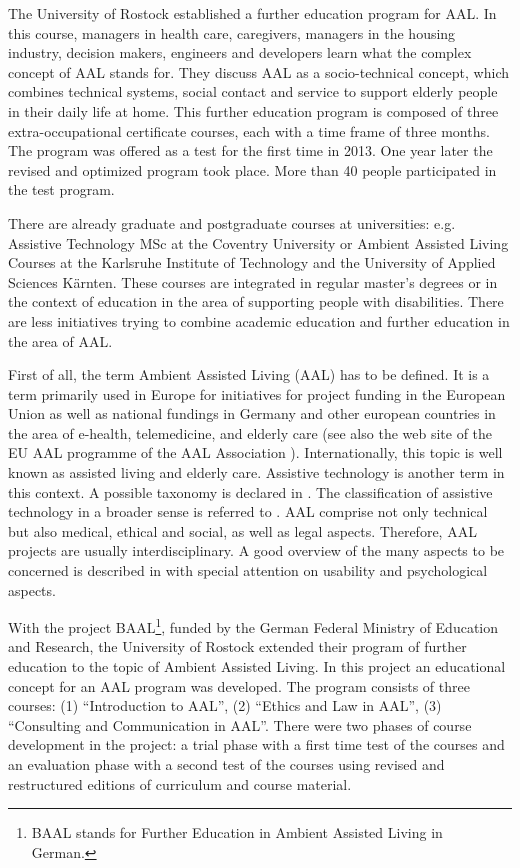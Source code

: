\documentclass[runningheads,a4paper]{llncs}
\begin{document}
The University of Rostock established a further education program for AAL. In this course, managers in health care, caregivers, managers in the housing industry, decision makers, engineers and developers learn what the complex concept of AAL stands for. They discuss AAL as a socio-technical concept, which combines technical systems, social contact and service to support elderly people in their daily life at home. This further education program is composed of three extra-occupational certificate courses, each with a time frame of three months. The program was offered as a test for the first time in 2013. One year later the revised and optimized program took place. More than 40 people participated in the test program.

There are already graduate and postgraduate courses at universities: e.g. Assistive Technology MSc at the Coventry University or Ambient Assisted Living Courses at the Karlsruhe Institute of Technology and the University of Applied Sciences Kärnten. These courses are integrated in regular master's degrees or in the context of education in the area of supporting people with disabilities. There are less initiatives trying to combine academic education and further education in the area of AAL.

First of all, the term Ambient Assisted Living (AAL) has to be defined. It is a term primarily used in Europe for initiatives for project funding in the European Union as well as national fundings in Germany and other european countries in the area of e-health, telemedicine, and elderly care (see also the web site of the EU AAL programme of the AAL Association \cite{EUAAL}).  Internationally, this topic is well known as assisted living and elderly care. Assistive technology is another term in this context. A possible taxonomy is declared in \cite{DMBB+07}. The classification of assistive technology in a broader sense is referred to \cite{DMBB+07}. 
AAL comprise not only technical but also medical, ethical and social, as well as legal aspects. Therefore, AAL projects are usually interdisciplinary. A good overview of the many aspects to be concerned is described in \cite{LeFe10} with special attention on usability and psychological aspects.

With the project BAAL\footnote{BAAL stands for Further Education in Ambient Assisted Living in German.}, funded by the German Federal Ministry of Education and Research, the University of Rostock extended their program of further education to the topic of Ambient Assisted Living. In this project an educational concept for an AAL program was developed. The program consists of three courses:
(1) ``Introduction to AAL'', (2) ``Ethics and Law in AAL'', (3) ``Consulting and Communication in AAL''. There were two phases of course development in the project: a trial phase with a first time test of the courses and an evaluation phase with a second test of the courses using revised and restructured editions of curriculum and course material.
\end{document}
